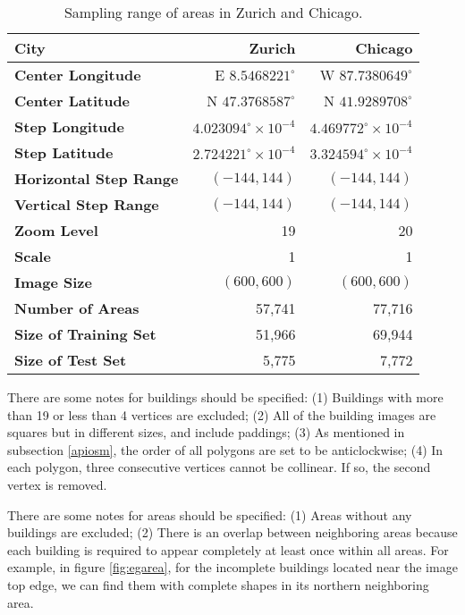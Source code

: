 \begin{table}[!h]
	\centering
	\caption[Sampling range of areas in Zurich and Chicago]{Sampling range of areas in Zurich and Chicago.}
	\label{tab:arerange}
	\begin{tabular}{l|r|r}
	\hline
	\textbf{City} & Zurich & Chicago \\ \hline
	\textbf{Center Longitude }& E $8.5468221^\circ$ & W $87.7380649^\circ$ \\
	\textbf{Center Latitude} & N $47.3768587^\circ$ & N $41.9289708^\circ$ \\
	\textbf{Step Longitude} & $4.023094^\circ\times10^{-4}$ & $4.469772^\circ\times10^{-4}$ \\
	\textbf{Step Latitude} & $2.724221^\circ\times10^{-4}$ & $3.324594^\circ\times10^{-4}$ \\
	\textbf{Horizontal Step Range} & $(-144, 144)$ & $(-144, 144)$ \\
	\textbf{Vertical Step Range} & $(-144, 144)$ & $(-144, 144)$ \\
	\textbf{Zoom Level} & 19 & 20 \\
	\textbf{Scale} & 1 & 1 \\
	\textbf{Image Size} & $(600, 600)$ & $(600, 600)$ \\
	\hline
	\textbf{Number of Areas} & 57,741 & 77,716 \\
	\textbf{Size of Training Set} & 51,966 & 69,944 \\
	\textbf{Size of Test Set} & 5,775 & 7,772 \\
	\hline
	\end{tabular}
\end{table}

There are some notes for buildings should be specified: (1) Buildings with more than 19 or less than 4 vertices are excluded; (2) All of the building images are squares but in different sizes, and include paddings; (3) As mentioned in subsection \ref{apiosm}, the order of all polygons are set to be anticlockwise; (4) In each polygon, three consecutive vertices cannot be collinear. If so, the second vertex is removed.

There are some notes for areas should be specified: (1) Areas without any buildings are excluded; (2) There is an overlap between neighboring areas because each building is required to appear completely at least once within all areas. For example, in figure \ref{fig:egarea}, for the incomplete buildings located near the image top edge, we can find them with complete shapes in its northern neighboring area.

